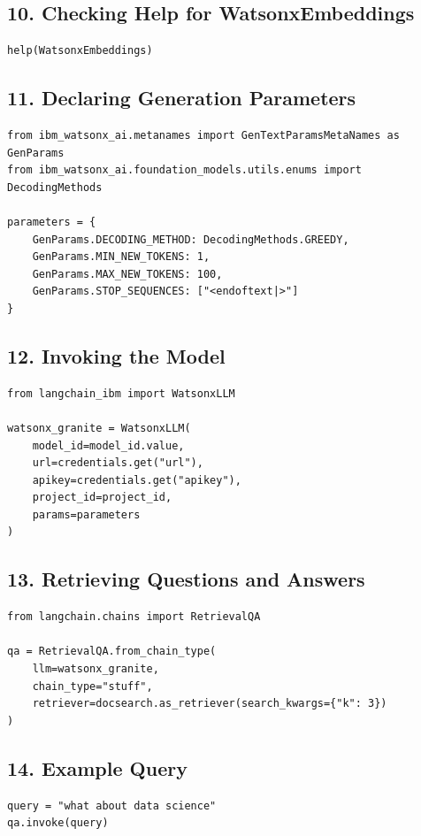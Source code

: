 \documentclass[12pt]{article}
\begin{document}
\subsection*{10. Checking Help for WatsonxEmbeddings}
\begin{lstlisting}
help(WatsonxEmbeddings)
\end{lstlisting}

\subsection*{11. Declaring Generation Parameters}
\begin{lstlisting}
from ibm_watsonx_ai.metanames import GenTextParamsMetaNames as GenParams 
from ibm_watsonx_ai.foundation_models.utils.enums import DecodingMethods

parameters = {
    GenParams.DECODING_METHOD: DecodingMethods.GREEDY,
    GenParams.MIN_NEW_TOKENS: 1,
    GenParams.MAX_NEW_TOKENS: 100,
    GenParams.STOP_SEQUENCES: ["<endoftext|>"]
}
\end{lstlisting}

\subsection*{12. Invoking the Model}
\begin{lstlisting}
from langchain_ibm import WatsonxLLM

watsonx_granite = WatsonxLLM(
    model_id=model_id.value,
    url=credentials.get("url"),
    apikey=credentials.get("apikey"),
    project_id=project_id,
    params=parameters
)
\end{lstlisting}

\subsection*{13. Retrieving Questions and Answers}
\begin{lstlisting}
from langchain.chains import RetrievalQA

qa = RetrievalQA.from_chain_type(
    llm=watsonx_granite,
    chain_type="stuff",
    retriever=docsearch.as_retriever(search_kwargs={"k": 3})
)
\end{lstlisting}

\subsection*{14. Example Query}
\begin{lstlisting}
query = "what about data science"
qa.invoke(query)
\end{lstlisting}
\end{document}
